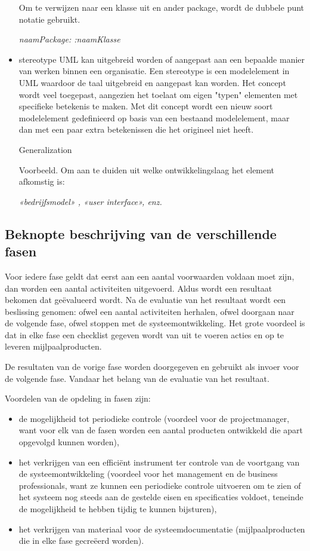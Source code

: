 \begin{itemize}
Om te verwijzen naar een klasse uit en ander package, wordt de dubbele punt notatie gebruikt.

\begin{center} \textit{naamPackage: :naamKlasse}\end{center}
      \item stereotype
UML kan uitgebreid worden of aangepast aan een bepaalde manier van werken binnen een organisatie. Een stereotype is een modelelement in UML waardoor de taal uitgebreid en aangepast kan worden. Het concept wordt veel toegepast, aangezien het toelaat om eigen "typen" elementen met specifieke betekenis te maken. Met dit concept wordt een nieuw soort modelelement gedefinieerd op basis van een bestaand modelelement, maar dan met een paar extra betekenissen die het origineel niet heeft.

Generalization

Voorbeeld. Om aan te duiden uit welke ontwikkelingslaag het element afkomstig is:

\begin{center} \textit{«bedrijfsmodel» , «user interface», enz.}\end{center}

\end{itemize}

\subsection{Beknopte beschrijving van de verschillende fasen}

Voor iedere fase geldt dat eerst aan een aantal voorwaarden voldaan moet zijn, dan worden een aantal activiteiten uitgevoerd. Aldus wordt een resultaat bekomen dat geëvalueerd wordt. Na de evaluatie van het resultaat wordt een beslissing genomen: ofwel een aantal activiteiten herhalen, ofwel doorgaan naar de volgende fase, ofwel stoppen met de systeemontwikkeling. Het grote voordeel is dat in elke fase een checklist gegeven wordt van uit te voeren acties en op te leveren mijlpaalproducten.

De resultaten van de vorige fase worden doorgegeven en gebruikt als invoer voor de volgende fase. Vandaar het belang van de evaluatie van het resultaat.

Voordelen van de opdeling in fasen zijn:

\begin{itemize}
    \item de mogelijkheid tot periodieke controle (voordeel voor de projectmanager, want voor elk van de fasen worden een aantal producten ontwikkeld die apart opgevolgd kunnen worden),
    \item het verkrijgen van een efficiënt instrument ter controle van de voortgang van de systeemontwikkeling (voordeel voor het management en de business professionals, want ze kunnen een periodieke controle uitvoeren om te zien of het systeem nog steeds aan de gestelde eisen en specificaties voldoet, teneinde de mogelijkheid te hebben tijdig te kunnen bijsturen),
    \item het verkrijgen van materiaal voor de systeemdocumentatie (mijlpaalproducten die in elke fase gecreëerd worden).
\end{itemize}

